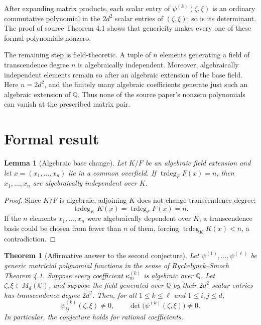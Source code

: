 \documentclass[11pt]{article}
\newtheorem{theorem}{Theorem}
\newtheorem{lemma}{Lemma}
\newcommand{\Q}{\mathbb{Q}}
\newcommand{\C}{\mathbb{C}}
\newcommand{\trdeg}{\operatorname{trdeg}}
\begin{document}
After expanding matrix products, each scalar entry of
\(\psi^{(k)}(\zeta,\xi)\) is an ordinary commutative polynomial in the
\(2d^2\) scalar entries of \((\zeta,\xi)\); so is its determinant. The proof
of source Theorem 4.1 shows that genericity makes every one of these formal
polynomials nonzero.

The remaining step is field-theoretic. A tuple of \(n\) elements generating
a field of transcendence degree \(n\) is algebraically independent. Moreover,
algebraically independent elements remain so after an algebraic extension of
the base field. Here \(n=2d^2\), and the finitely many algebraic coefficients
generate just such an algebraic extension of \(\Q\). Thus none of the source
paper's nonzero polynomials can vanish at the prescribed matrix pair.

\section{Formal result}

\begin{lemma}[Algebraic base change]
Let \(K/F\) be an algebraic field extension and let
\(x=(x_1,\dots,x_n)\) lie in a common overfield. If
\(\trdeg_F F(x)=n\), then \(x_1,\dots,x_n\) are algebraically independent
over \(K\).
\end{lemma}

\begin{proof}
Since \(K/F\) is algebraic, adjoining \(K\) does not change transcendence
degree:
\[
 \trdeg_K K(x)=\trdeg_F F(x)=n.
\]
If the \(n\) elements \(x_1,\dots,x_n\) were algebraically dependent over
\(K\), a transcendence basis could be chosen from fewer than \(n\) of them,
forcing \(\trdeg_K K(x)<n\), a contradiction.
\end{proof}

\begin{theorem}[Affirmative answer to the second conjecture]
Let \(\psi^{(1)},\dots,\psi^{(\ell)}\) be generic matricial polynomial
functions in the sense of Ryckelynck--Smoch Theorem 4.1. Suppose every
coefficient \(\kappa^{(k)}_m\) is algebraic over \(\Q\). Let
\(\zeta,\xi\in M_d(\C)\), and suppose the field generated over \(\Q\) by
their \(2d^2\) scalar entries has transcendence degree \(2d^2\). Then, for
all \(1\leq k\leq\ell\) and \(1\leq i,j\leq d\),
\[
 \psi^{(k)}_{ij}(\zeta,\xi)\ne0,
 \qquad
 \det\!\bigl(\psi^{(k)}(\zeta,\xi)\bigr)\ne0.
\]
In particular, the conjecture holds for rational coefficients.
\end{theorem}
\end{document}
